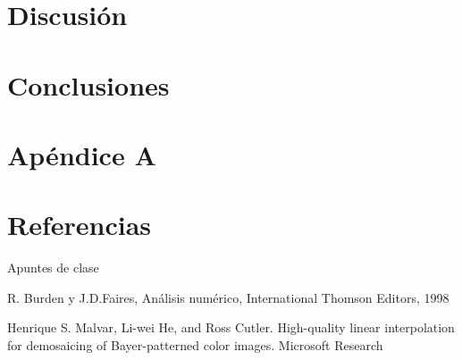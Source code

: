 \documentclass[a4paper]{article}
\begin{document}
\newpage
\section{Discusi\'{o}n}
\label{sec:discusion}


\newpage

\section{Conclusiones}
\label{sec:conclusiones}



\newpage

\section{Apéndice A}
\label{sec:ApA}


\newpage

\section{Referencias}
\label{sec:ref}

Apuntes de clase

R. Burden y J.D.Faires, Análisis numérico, International Thomson Editors, 1998

Henrique S. Malvar, Li-wei He, and Ross Cutler. High-quality linear interpolation for demosaicing of Bayer-patterned color images. Microsoft Research
\end{document}
